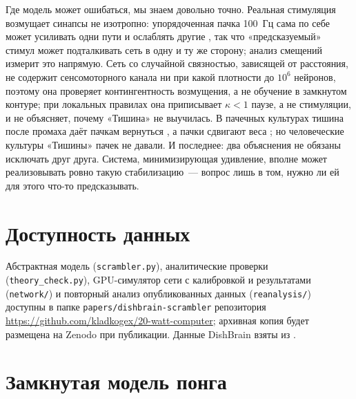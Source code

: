 \documentclass[pre,twocolumn,superscriptaddress,showpacs=false,amsmath,amssymb,nofootinbib]{revtex4-2}
\begin{document}
Где модель может ошибаться, мы знаем довольно точно. Реальная стимуляция возмущает синапсы не изотропно: упорядоченная пачка 100~Гц сама по себе может усиливать одни пути и ослаблять другие \cite{Jimbo1999}, так что «предсказуемый» стимул может подталкивать сеть в одну и ту же сторону; анализ смещений измерит это напрямую. Сеть со случайной связностью, зависящей от расстояния, не содержит сенсомоторного канала ни при какой плотности до $10^6$ нейронов, поэтому она проверяет контингентность возмущения, а не обучение в замкнутом контуре; при локальных правилах она приписывает $\kappa<1$ паузе, а не стимуляции, и не объясняет, почему «Тишина» не выучилась. В пачечных культурах тишина после промаха даёт пачкам вернуться \cite{Wagenaar2005}, а пачки сдвигают веса \cite{Chao2005}; но человеческие культуры «Тишины» пачек не давали. И последнее: два объяснения не обязаны исключать друг друга. Система, минимизирующая удивление, вполне может реализовывать ровно такую стабилизацию~--- вопрос лишь в том, нужно ли ей для этого что-то предсказывать.

\section*{Доступность данных}
Абстрактная модель (\texttt{scrambler.py}), аналитические проверки (\texttt{theory\_check.py}), GPU-симулятор сети с калибровкой и результатами (\texttt{network/}) и повторный анализ опубликованных данных (\texttt{reanalysis/}) доступны в папке \texttt{papers/dishbrain-scrambler} репозитория \url{https://github.com/kladkogex/20-watt-computer}; архивная копия будет размещена на Zenodo при публикации. Данные DishBrain взяты из \cite{OSF2022}.

\appendix

\section{Замкнутая модель понга}\label{app:abstract}
\end{document}
